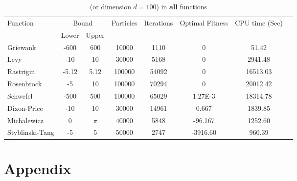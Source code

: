 \documentclass[12pt]{article}
\begin{document}
	\begin{table}[H]
		\caption{ (or dimension $d=100$) in \textbf{all} functions}
		\label{table:1}
		\centering
		\begin{tabular}{l c c c c c c c}
			\hline
			Function &  \multicolumn{2}{c}{Bound} & Particles & Iterations &  Optimal Fitness & CPU time (Sec) \\
			& Lower& Upper&&&\\
			\hline
			Griewank  		&  -600   & 600 		&10000 &1110 &0 &51.42 &\\
			Levy 	  		&  -10    & 10 		&30000 &5168 &0 &2941.48 &\\
			Rastrigin 		&  -5.12  & 5.12 	&100000 &54092 &0 &16513.03 &\\
			Rosenbrock		&  -5     & 10 		&100000 &70294 &0 &20012.42 &\\
			Schwefel 	 	&  -500   & 500 	&100000 &65029 &1.27E-3 &18314.78 &\\
			Dixon-Price 	&   -10	  & 10 		&30000 &14961 &0.667 &1839.85 &\\
			Michalewicz 	&   0 	  & $\pi$ 	&40000 &5848 &-96.167 &1252.60 &\\
			Styblinski-Tang & -5 	  & 5  		&50000 &2747 &-3916.60 &960.39 &\\
			\hline
		\end{tabular}
	\end{table}
	
	
	
	
	
	
	 
	\newpage
	\section{Appendix}
	
\end{document}
